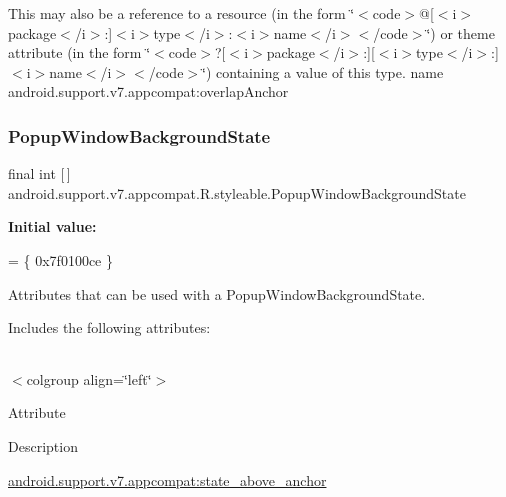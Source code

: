 This may also be a reference to a resource (in the form \char`\"{}$<$code$>$@\mbox{[}$<$i$>$package$<$/i$>$\+:\mbox{]}$<$i$>$type$<$/i$>$\+:$<$i$>$name$<$/i$>$$<$/code$>$\char`\"{}) or theme attribute (in the form \char`\"{}$<$code$>$?\mbox{[}$<$i$>$package$<$/i$>$\+:\mbox{]}\mbox{[}$<$i$>$type$<$/i$>$\+:\mbox{]}$<$i$>$name$<$/i$>$$<$/code$>$\char`\"{}) containing a value of this type.  name android.\+support.\+v7.\+appcompat\+:overlap\+Anchor \mbox{\label{classandroid_1_1support_1_1v7_1_1appcompat_1_1R_1_1styleable_af780db5a661b33d826f07231dfde13ec}} 
\subsubsection{\texorpdfstring{Popup\+Window\+Background\+State}{PopupWindowBackgroundState}}
{\footnotesize\ttfamily final int \mbox{[}$\,$\mbox{]} android.\+support.\+v7.\+appcompat.\+R.\+styleable.\+Popup\+Window\+Background\+State\hspace{0.3cm}{\ttfamily [static]}}

{\bfseries Initial value\+:}
\begin{DoxyCode}
= \{
            0x7f0100ce
        \}
\end{DoxyCode}
Attributes that can be used with a Popup\+Window\+Background\+State. 

Includes the following attributes\+:

\tabulinesep=1mm
\begin{longtabu} spread 0pt [c]{*{0}{|X[-1]}|}
\hline
\end{longtabu}
$<$colgroup align=\char`\"{}left\char`\"{}$>$ 

Attribute

Description 

{\ttfamily \hyperlink{classandroid_1_1support_1_1v7_1_1appcompat_1_1R_1_1styleable_a51c3c6df6f697d16ff02960ed889d6ad}{android.\+support.\+v7.\+appcompat\+:state\+\_\+above\+\_\+anchor}}

